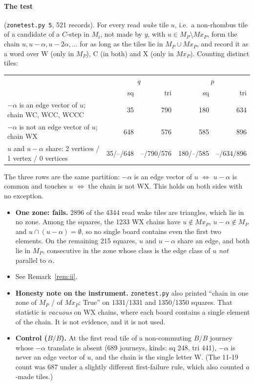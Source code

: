 \documentclass[11pt]{article}
\theoremstyle{definition}\newtheorem{definition}[theorem]{Definition}\newtheorem{remark}[theorem]{Remark}
\begin{document}
\paragraph{The test} (\texttt{zonetest.py 5}, 521 records). For every read \emph{wake} tile $u$, i.e.\ a non-rhombus tile of a candidate of a $C$-step in $M_i$, not made by $y$, with $u\in M_P\setminus Mx_P$, form the chain $u,u-\alpha,u-2\alpha,\dots$ for as long as the tiles lie in $M_P\cup Mx_P$, and record it as a word over W (only in $M_P$), C (in both) and X (only in $Mx_P$). Counting distinct tiles:
\begin{center}\begin{tabular}{lrrrr}\toprule
& \multicolumn{2}{c}{$q$} & \multicolumn{2}{c}{$p$}\\
& sq & tri & sq & tri\\\midrule
$-\alpha$ is an edge vector of $u$; chain WC, WCC, WCCC & 35 & 790 & 180 & 634\\
$-\alpha$ is not an edge vector of $u$; chain WX & 648 & 576 & 585 & 896\\
$u$ and $u-\alpha$ share: 2 vertices / 1 vertex / 0 vertices & 35/--/648 & --/790/576 & 180/--/585 & --/634/896\\\bottomrule
\end{tabular}\end{center}
The three rows are the same partition: $-\alpha$ is an edge vector of $u$ $\iff$ $u-\alpha$ is common and touches $u$ $\iff$ the chain is not WX. This holds on both sides with no exception.
\begin{itemize}
\item[(i)] \textbf{One zone: fails.} 2896 of the 4344 read wake tiles are triangles, which lie in no zone. Among the squares, the 1233 WX chains have $u\notin Mx_P$, $u-\alpha\notin M_P$ and $u\cap(u-\alpha)=\emptyset$, so no single board contains even the first two elements.
On the remaining 215 squares, $u$ and $u-\alpha$ share an edge, and both lie in $M_P$, consecutive in the zone whose class is the edge class of $u$ \emph{not} parallel to $\alpha$.
\item[(ii)] See Remark~\ref{rem:ii}.
\item \textbf{Honesty note on the instrument.} \texttt{zonetest.py} also printed ``chain in one zone of $M_P$ / of $Mx_P$: True'' on 1331/1331 and 1350/1350 squares. That statistic is \emph{vacuous} on WX chains, where each board contains a single element of the chain. It is not evidence, and it is not used.
\item \textbf{Control ($B/B$).} At the first read tile of a non-commuting $B/B$ journey whose $-\alpha$ translate is absent (689 journeys, kinds: sq 248, tri 441), $-\alpha$ is never an edge vector of $u$, and the chain is the single letter W. (The 11-19 count was 687 under a slightly different first-failure rule, which also counted $a$-made tiles.)
\end{itemize}
\end{document}
